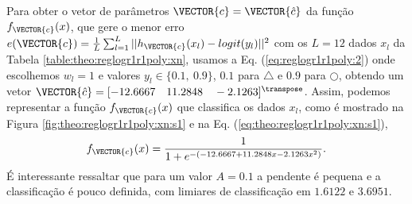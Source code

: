 \begin{SolutionT}\label{sol:theo:reglogr1r1poly:s1}
Para obter o vetor de parâmetros $\VECTOR{c}=\VECTOR{\hat{c}}$ da função $f_{\VECTOR{c}}(x)$, 
que gere o menor erro $e(\VECTOR{c}) =  \frac{1}{L} \sum_{l=1}^{L} ||h_{\VECTOR{c}}(x_l)-logit(y_l)||^2$
com os $L=12$ dados $x_l$ da Tabela \ref{table:theo:reglogr1r1poly:xn},
usamos a Eq. (\ref{eq:reglogr1r1poly:2}) onde escolhemos $w_l=1$ e valores $y_l \in \{0.1,~ 0.9\}$,
$0.1$ para $\bigtriangleup$ e $0.9$ para $\bigcirc$,
obtendo um vetor $\VECTOR{\hat{c}}=[-12.6667\quad 11.2848\quad -2.1263]^{\transpose}$.
Assim, podemos representar a função $f_{\VECTOR{c}}(x)$ que classifica os dados $x_l$, 
como é mostrado na Figura \ref{fig:theo:reglogr1r1poly:xn:s1} e na Eq. (\ref{eq:theo:reglogr1r1poly:xn:s1}),
\begin{equation}\label{eq:theo:reglogr1r1poly:xn:s1}
f_{\VECTOR{c}}(x)= \frac{1}{1+e^{-(-12.6667  +11.2848 x  -2.1263 x^2)}}.
\end{equation}
É interessante ressaltar que para um valor $A=0.1$ a pendente é pequena e a classificação é pouco definida,
com limiares de classificação em $1.6122$ e $3.6951$.
\end{SolutionT}

